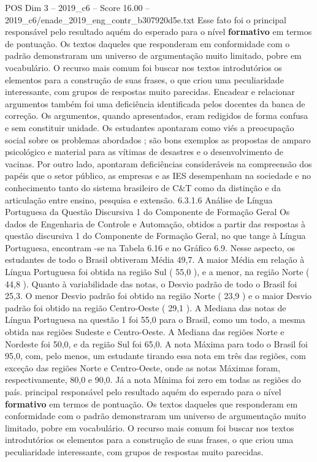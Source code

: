 \begin{textsample}{POS Dim 3 – 2019\_c6 – Score 16.00 – 2019\_c6/enade\_2019\_eng\_contr\_b307920d5e.txt}
Esse fato foi o principal responsável pelo resultado aquém do esperado para o nível \textbf{formativo} em termos de pontuação.
Os textos daqueles que responderam em conformidade com o padrão demonstraram um universo de argumentação muito limitado, pobre em vocabulário.
O recurso mais comum foi buscar nos textos introdutórios os elementos para a construção de suas frases, o que criou uma peculiaridade interessante, com grupos de respostas muito parecidas.
Encadear e relacionar argumentos também foi uma deficiência identificada pelos docentes da banca de correção.
Os argumentos, quando apresentados, eram redigidos de forma confusa e sem constituir unidade.
Os estudantes apontaram como viés a preocupação social sobre os problemas abordados ; são bons exemplos as propostas de amparo psicológico e material para as vítimas de desastres e o desenvolvimento de vacinas.
Por outro lado, apontaram deficiências consideráveis na compreensão dos papéis que o setor público, as empresas e as IES desempenham na sociedade e no conhecimento tanto do sistema brasileiro de C\&T como da distinção e da articulação entre ensino, pesquisa e extensão. 6.3.1.6 Análise de Língua Portuguesa da Questão Discursiva 1 do Componente de Formação Geral Os dados de Engenharia de Controle e Automação, obtidos a partir das respostas à questão discursiva 1 do Componente de Formação Geral, no que tange à Língua Portuguesa, encontram -se na Tabela 6.16 e no Gráfico 6.9.
Nesse aspecto, os estudantes de todo o Brasil obtiveram Média 49,7.
A maior Média em relação à Língua Portuguesa foi obtida na região Sul ( 55,0 ), e a menor, na região Norte ( 44,8 ).
Quanto à variabilidade das notas, o Desvio padrão de todo o Brasil foi 25,3.
O menor Desvio padrão foi obtido na região Norte ( 23,9 ) e o maior Desvio padrão foi obtido na região Centro-Oeste ( 29,1 ).
A Mediana das notas de Língua Portuguesa na questão 1 foi 55,0 para o Brasil, como um todo, a mesma obtida nas regiões Sudeste e Centro-Oeste.
A Mediana das regiões Norte e Nordeste foi 50,0, e da região Sul foi 65,0.
A nota Máxima para todo o Brasil foi 95,0, com, pelo menos, um estudante tirando essa nota em três das regiões, com exceção das regiões Norte e Centro-Oeste, onde as notas Máximas foram, respectivamente, 80,0 e 90,0.
Já a nota Mínima foi zero em todas as regiões do país. principal responsável pelo resultado aquém do esperado para o nível \textbf{formativo} em termos de pontuação.
Os textos daqueles que responderam em conformidade com o padrão demonstraram um universo de argumentação muito limitado, pobre em vocabulário.
O recurso mais comum foi buscar nos textos introdutórios os elementos para a construção de suas frases, o que criou uma peculiaridade interessante, com grupos de respostas muito parecidas.

\end{textsample}
